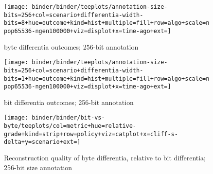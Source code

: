 \begin{figure*}
  \centering

\begin{minipage}{\textwidth}
\begin{subfigure}[b]{0.4\textwidth}
\centering
\texttt{[image: binder/binder/teeplots/annotation-size-bits=256+col=scenario+differentia-width-bits=8+hue=outcome+kind=hist+multiple=fill+row=algo+scale=npop65536-ngen100000+viz=displot+x=time-ago+ext=]}
\footnotesize
\caption{byte differentia outcomes; 256-bit annotation}
  \label{fig:bit-vs-byte-summary-byte-outcomes}
  \end{subfigure}%
\begin{subfigure}[b]{0.6\textwidth}
\centering
\texttt{[image: binder/binder/teeplots/annotation-size-bits=256+col=scenario+differentia-width-bits=1+hue=outcome+kind=hist+multiple=fill+row=algo+scale=npop65536-ngen100000+viz=displot+x=time-ago+ext=]}
\footnotesize
\caption{bit differentia outcomes; 256-bit annotation}
\label{fig:bit-vs-byte-summary-bit-outcomes}
\end{subfigure}
\end{minipage}
  \begin{subfigure}[b]{\textwidth}
    \centering
    \texttt{[image: binder/binder/bit-vs-byte/teeplots/col=metric+hue=relative-grade+kind=strip+row=policy+viz=catplot+x=cliff-s-delta+y=scenario+ext=]}
    \footnotesize
    \caption{Reconstruction quality of byte differentia, relative to bit differentia; 256-bit size annotation}
  \label{fig:bit-vs-byte-summary-quality}
  \end{subfigure}%
\caption{%
}
\end{figure*}

